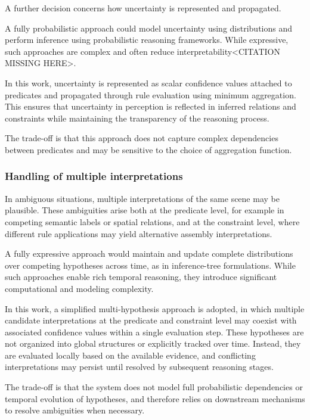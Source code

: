 \documentclass[11pt,titlepage,openright]{book}
\begin{document}
A further decision concerns how uncertainty is represented and propagated.

A fully probabilistic approach could model uncertainty using distributions and perform inference using probabilistic reasoning frameworks. While expressive, such approaches are complex and often reduce interpretability<CITATION MISSING HERE>.

In this work, uncertainty is represented as scalar confidence values attached to predicates and propagated through rule evaluation using minimum aggregation. This ensures that uncertainty in perception is reflected in inferred relations and constraints while maintaining the transparency of the reasoning process.

The trade-off is that this approach does not capture complex dependencies between predicates and may be sensitive to the choice of aggregation function.

\subsubsection{Handling of multiple interpretations}

In ambiguous situations, multiple interpretations of the same scene may be plausible. These ambiguities arise both at the predicate level, for example in competing semantic labels or spatial relations, and at the constraint level, where different rule applications may yield alternative assembly interpretations.

A fully expressive approach would maintain and update complete distributions over competing hypotheses across time, as in inference-tree formulations. While such approaches enable rich temporal reasoning, they introduce significant computational and modeling complexity.

In this work, a simplified multi-hypothesis approach is adopted, in which multiple candidate interpretations at the predicate and constraint level may coexist with associated confidence values within a single evaluation step. These hypotheses are not organized into global structures or explicitly tracked over time. Instead, they are evaluated locally based on the available evidence, and conflicting interpretations may persist until resolved by subsequent reasoning stages.

The trade-off is that the system does not model full probabilistic dependencies or temporal evolution of hypotheses, and therefore relies on downstream mechanisms to resolve ambiguities when necessary.
\end{document}
